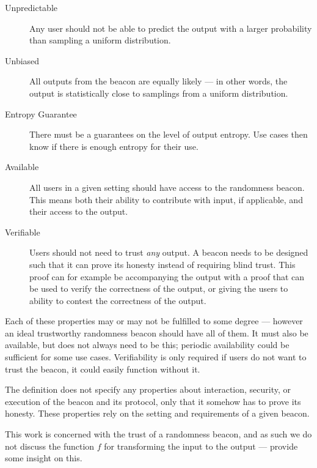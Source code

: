 \begin{description}
    \item[Unpredictable]
        Any user should not be able to predict the output with a larger probability than sampling a uniform distribution. 
    \item[Unbiased]
        All outputs from the beacon are equally likely --- in other words, the output is statistically close to samplings from a uniform distribution. 
    \item[Entropy Guarantee]
        There must be a guarantees on the level of output entropy.
Use cases then know if there is enough entropy for their use.
    \item[Available]
        All users in a given setting should have access to the randomness beacon.
        This means both their ability to contribute with input, if applicable, and their access to the output.
    \item[Verifiable]
        Users should not need to trust \emph{any} output.
        A beacon needs to be designed such that it can prove its honesty instead of requiring blind trust.
        This proof can for example be accompanying the output with a proof that can be used to verify the correctness of the output, or giving the users to ability to contest the correctness of the output.
\end{description}

Each of these properties may or may not be fulfilled to some degree --- however an ideal trustworthy randomness beacon should have all of them.%
It must also be available, but does not always need to be this; periodic availability could be sufficient for some use cases.
Verifiability is only required if users do not want to trust the beacon, it could easily function without it.


The definition does not specify any properties about interaction, security, or execution of the beacon and its protocol, only that it somehow has to prove its honesty.
These properties rely on the setting and requirements of a given beacon.

This work is concerned with the trust of a randomness beacon, and as such we do not discuss the function $f$ for transforming the input to the output --- \citet{bonneau2015bitcoin, dodis2004randomness} provide some insight on this.
